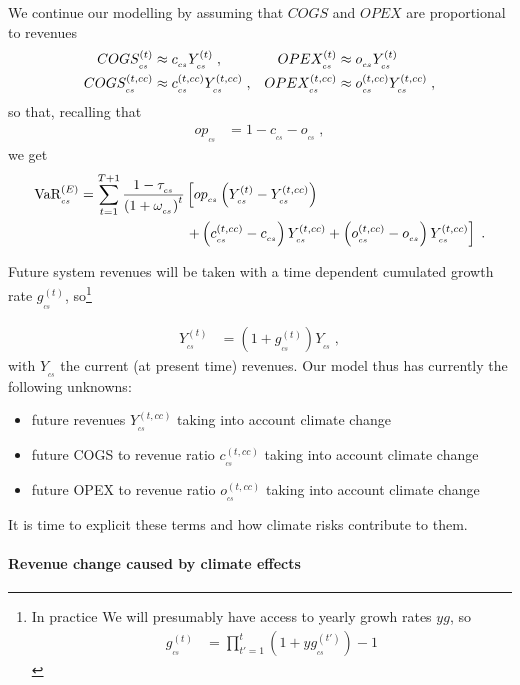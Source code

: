 We continue our modelling by assuming that $COGS$ and $OPEX$ are proportional to revenues \cite{Damodaran3}
\begin{align}
COGS^{(t)}_{_{cs}}&\approx c_{_{cs}} Y^{(t)}_{_{cs}}\;,&
%
OPEX^{(t)}_{_{cs}}&\approx o_{_{cs}} Y^{(t)}_{_{cs}}\notag\\
%
COGS^{(t,cc)}_{_{cs}}&\approx c^{(t,cc)}_{_{cs}} Y^{(t,cc)}_{_{cs}}\;,&
%
OPEX^{(t,cc)}_{_{cs}}&\approx o^{(t,cc)}_{_{cs}} Y^{(t,cc)}_{_{cs}}\;,
\end{align}
so that, recalling that
\begin{align}
op_{_{cs}}&=1- c_{_{cs}}-o_{_{cs}}\;,
\end{align}
we get
\begin{align}
\text{VaR}^{(E)}_{_{cs}}=\sum_{t=1}^{T+1}\frac{1-\tau_{_{cs}}}{\left(1+\omega_{_{cs}}\right)^t}&\left[
%
op_{_{cs}}\left(Y^{(t)}_{_{cs}}-Y^{(t,cc)}_{_{cs}}\right)\right.\notag\\
%
&\left. +\left(c^{(t,cc)}_{_{cs}}- c_{_{cs}}\right)Y^{(t,cc)}_{_{cs}}
%
+\left(o^{(t,cc)}_{_{cs}}- o_{_{cs}}\right)Y^{(t,cc)}_{_{cs}}
\right]\;.\label{eq:central}
\end{align}

Future system revenues will be taken with a time dependent cumulated growth rate $g^{(t)}_{_{cs}}$, so\footnote{In practice We will presumably have access to yearly growh rates $yg$, so
\begin{align*}
g^{(t)}_{_{cs}}&=\prod_{t'=1}^{t}\left(1+yg^{(t')}_{_{cs}}\right)-1
\end{align*}} 

\begin{align}
Y^{(t)}_{_{cs}}&=\left(1+g^{(t)}_{_{cs}}\right)Y_{_{cs}}\;,
\end{align}
with $Y_{_{cs}}$ the current (at present time) revenues. Our model thus has currently the following unknowns:
\begin{itemize}
\item[•] future revenues $Y^{(t,cc)}_{_{cs}}$ taking into account climate change
\item[•] future COGS to revenue ratio $c^{(t,cc)}_{_{cs}}$ taking into account climate change
\item[•] future OPEX to revenue ratio $o^{(t,cc)}_{_{cs}}$ taking into account climate change
\end{itemize}

It is time to explicit these terms and how climate risks contribute to them.

\paragraph{Revenue change caused by climate effects}

